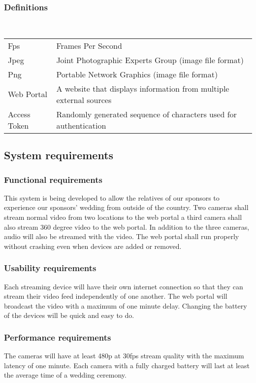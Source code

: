 \documentclass[onecolumn, draftclsnofoot,10pt, compsoc]{IEEEtran}
\begin{document}
        \subsubsection{Definitions} \\
        \begin{tabular}{ll}
         Fps & Frames Per Second \\ 
         Jpeg & Joint Photographic Experts Group (image file format) \\ 
         Png & Portable Network Graphics (image file format) \\
         Web Portal & A website that displays information from multiple external sources \\ 
         Access Token & Randomly generated sequence of characters used for authentication \\
        \end{tabular}

\subsection{System requirements}
    \subsubsection{Functional requirements}
    This system is being developed to allow the relatives of our sponsors to experience our sponsors' wedding from outside of the country.
    Two cameras shall stream normal video from two locations to the web portal a third camera shall also stream 360 degree video to the web portal. In addition to the three cameras, audio will also be streamed with the video.
    The web portal shall run properly without crashing even when devices are added or removed.
    
    \subsubsection{Usability requirements}
    Each streaming device will have their own internet connection so that they can stream their video feed independently of one another.
    The web portal will broadcast the video with a maximum of one minute delay. Changing the battery of the devices will be quick and easy to do. 
    
    \subsubsection{Performance requirements}
    The cameras will have at least 480p at 30fps stream quality with the maximum latency of one minute. 
    Each camera with a fully charged battery will last at least the average time of a wedding ceremony. 
 
\end{document}

